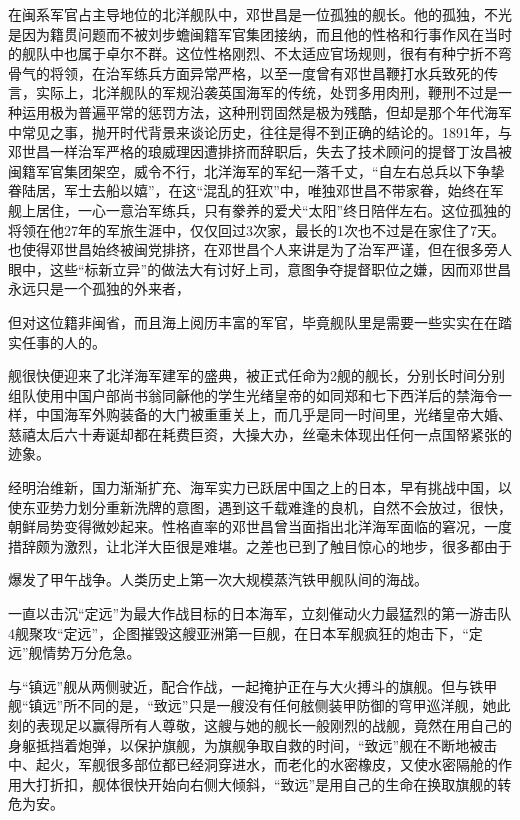 \documentclass[12pt,UTF8]{ctexbook}
\begin{document}
在闽系军官占主导地位的北洋舰队中，邓世昌是一位孤独的舰长。他的孤独，不光是因为籍贯问题而不被刘步蟾闽籍军官集团接纳，而且他的性格和行事作风在当时的舰队中也属于卓尔不群。这位性格刚烈、不太适应官场规则，很有有种宁折不弯骨气的将领，在治军练兵方面异常严格，以至一度曾有邓世昌鞭打水兵致死的传言，实际上，北洋舰队的军规沿袭英国海军的传统，处罚多用肉刑，鞭刑不过是一种运用极为普遍平常的惩罚方法，这种刑罚固然是极为残酷，但却是那个年代海军中常见之事，抛开时代背景来谈论历史，往往是得不到正确的结论的。1891年，与邓世昌一样治军严格的琅威理因遭排挤而辞职后，失去了技术顾问的提督丁汝昌被闽籍军官集团架空，威令不行，北洋海军的军纪一落千丈，“自左右总兵以下争挚眷陆居，军士去船以嬉”，在这“混乱的狂欢”中，唯独邓世昌不带家眷，始终在军舰上居住，一心一意治军练兵，只有豢养的爱犬“太阳”终日陪伴左右。这位孤独的将领在他27年的军旅生涯中，仅仅回过3次家，最长的1次也不过是在家住了7天。也使得邓世昌始终被闽党排挤，在邓世昌个人来讲是为了治军严谨，但在很多旁人眼中，这些“标新立异”的做法大有讨好上司，意图争夺提督职位之嫌，因而邓世昌永远只是一个孤独的外来者，

但对这位籍非闽省，而且海上阅历丰富的军官，毕竟舰队里是需要一些实实在在踏实任事的人的。

舰很快便迎来了北洋海军建军的盛典，被正式任命为2舰的舰长，分别长时间分别组队使用中国户部尚书翁同龢他的学生光绪皇帝的如同郑和七下西洋后的禁海令一样，中国海军外购装备的大门被重重关上，而几乎是同一时间里，光绪皇帝大婚、慈禧太后六十寿诞却都在耗费巨资，大操大办，丝毫未体现出任何一点国帑紧张的迹象。

经明治维新，国力渐渐扩充、海军实力已跃居中国之上的日本，早有挑战中国，以使东亚势力划分重新洗牌的意图，遇到这千载难逢的良机，自然不会放过，很快，朝鲜局势变得微妙起来。性格直率的邓世昌曾当面指出北洋海军面临的窘况，一度措辞颇为激烈，让北洋大臣很是难堪。之差也已到了触目惊心的地步，很多都由于

爆发了甲午战争。人类历史上第一次大规模蒸汽铁甲舰队间的海战。

一直以击沉“定远”为最大作战目标的日本海军，立刻催动火力最猛烈的第一游击队4舰聚攻“定远”，企图摧毁这艘亚洲第一巨舰，在日本军舰疯狂的炮击下，“定远”舰情势万分危急。

与“镇远”舰从两侧驶近，配合作战，一起掩护正在与大火搏斗的旗舰。但与铁甲舰“镇远”所不同的是，“致远”只是一艘没有任何舷侧装甲防御的穹甲巡洋舰，她此刻的表现足以赢得所有人尊敬，这艘与她的舰长一般刚烈的战舰，竟然在用自己的身躯抵挡着炮弹，以保护旗舰，为旗舰争取自救的时间，“致远”舰在不断地被击中、起火，军舰很多部位都已经洞穿进水，而老化的水密橡皮，又使水密隔舱的作用大打折扣，舰体很快开始向右侧大倾斜，“致远”是用自己的生命在换取旗舰的转危为安。
\end{document}

